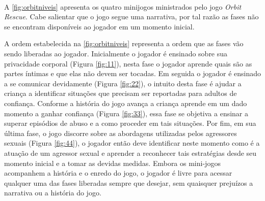\begin{figure}
  \vspace{-4pt}
  \\
  \vspace{-4pt}
  \vspace{-8pt}
\end{figure}

A \autoref{fig:orbitniveis} apresenta os quatro minijogos ministrados pelo jogo \textit{Orbit Rescue}. Cabe salientar que o jogo segue uma narrativa, por tal razão as fases não se encontram disponíveis ao jogador em um momento inicial. 

A ordem estabelecida na \autoref{fig:orbitniveis} representa a ordem que as fases vão sendo liberadas ao jogador. Inicialmente o jogador é ensinado sobre sua privacidade corporal (Figura \ref{fig:11}), nesta fase o jogador aprende quais são as partes íntimas e que elas não devem ser tocadas. Em seguida o jogador é ensinado a se comunicar devidamente (Figura \ref{fig:22}), o intuito desta fase é ajudar a criança a identificar situações que precisam ser reportadas para adultos de confiança. Conforme a história do jogo avança a criança aprende em um dado momento a ganhar confiança (Figura \ref{fig:33}), essa fase se objetiva a ensinar a superar episódios de abuso e a como proceder em tais situações. Por fim, em sua última fase, o jogo discorre sobre as abordagens utilizadas pelos agressores sexuais  (Figura \ref{fig:44}), o jogador então deve identificar neste momento como é a atuação de um agressor sexual e aprender a reconhecer tais estratégias desde seu momento inicial e a tomar as devidas medidas. Embora os mini-jogos acompanhem a história e o enredo do jogo, o jogador é livre para acessar qualquer uma das fases liberadas sempre que desejar, sem quaisquer prejuízos a narrativa ou a história do jogo. 

